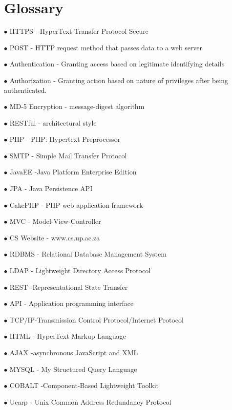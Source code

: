 \documentclass[a4paper,12pt]{report}
\begin{document}
\section{Glossary}
\item [$\bullet$] HTTPS - HyperText Transfer Protocol Secure
\item [$\bullet$] POST - HTTP request method that passes data to a web server
\item [$\bullet$] Authentication - Granting access based on legitimate identifying details
\item [$\bullet$] Authorization - Granting action based on nature of privileges after being authenticated.
\item [$\bullet$] MD-5 Encryption - message-digest algorithm
\item [$\bullet$] RESTful - architectural style
\item [$\bullet$] PHP - PHP: Hypertext Preprocessor
\item [$\bullet$] SMTP - Simple Mail Transfer Protocol
\item [$\bullet$] JavaEE -Java Platform Enterprise Edition
\item [$\bullet$] JPA - Java Persistence API
\item [$\bullet$] CakePHP - PHP web application framework
\item [$\bullet$] MVC - Model-View-Controller
\item [$\bullet$] CS Website - www.cs.up.ac.za
\item [$\bullet$] RDBMS - Relational Database Management System
\item [$\bullet$] LDAP - Lightweight Directory Access Protocol
\item [$\bullet$] REST -Representational State Transfer
\item [$\bullet$] API - Application programming interface
\item [$\bullet$] TCP/IP-Transmission Control Protocol/Internet Protocol
\item [$\bullet$] HTML - HyperText Markup Language
\item [$\bullet$] AJAX -asynchronous JavaScript and XML
\item [$\bullet$] MYSQL - My Structured Query Language
\item [$\bullet$] COBALT -Component-Based Lightweight Toolkit
\item [$\bullet$] Ucarp - Unix Common Address Redundancy Protocol
\end{document}
